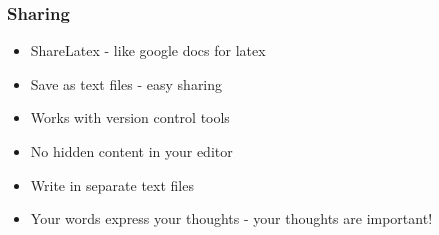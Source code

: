 \documentclass[screen, aspectratio=43]{beamer}
\begin{document}
\begin{frame}
  \frametitle{Sharing}
  \begin{itemize}
      \item ShareLatex - like google docs for latex
      \item Save as text files - easy sharing
      \item Works with version control tools
      \item No hidden content in your editor
      \item Write in separate text files
      \item Your words express your thoughts - your thoughts are important!
     
  \end{itemize}

\end{frame}
\end{document}
